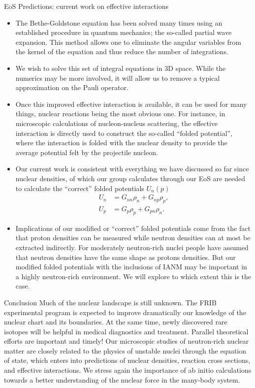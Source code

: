 \documentclass[serif]{beamer}
\begin{document}
\begin{frame}{}
\begin{columns}[t]
\begin{column}{0.32\paperwidth}
\begin{block}{EoS Predictions: current work on effective interactions}
\begin{itemize}
\item The Bethe-Goldstone equation has been solved many times using an established procedure in quantum mechanics; the so-called partial wave expansion. This method allows one to eliminate the angular variables from the kernel of the equation and thus reduce the number of integrations.
\item \alert{We wish to solve this set of integral equations in 3D space}. While the numerics may be more involved, it will allow us to remove a typical approximation on the Pauli operator.
\item Once this improved effective interaction is available, it can be used for many things, nuclear reactions being the most obvious one. For instance, in microscopic calculations of nucleon-nucleus scattering, the effective interaction is directly used to construct the so-called ``folded potential'', where the interaction is folded with the nuclear density to provide the average potential felt by the projectile nucleon.
\item \alert{Our current work is consistent with everything we have discussed so far} since nuclear densities, of which our group calculates through our EoS are needed to calculate the ``correct'' folded potentials $U_n(p)$
\begin{subequations}
\begin{align}
U_n & = G_{nn} \rho_n + G_{np} \rho_p, \\
U_p & = G_{p} \rho_p + G_{pn} \rho_n.
\end{align}
\label{eq:folded}
\end{subequations}
\item Implications of our modified or ``correct'' folded potentials come from the fact that proton densities can be measured while neutron densities can at most be extracted indirectly. For moderately neutron-rich nuclei people have assumed that neutron densities have the same shape as protons densities. But our modified folded potentials with the inclusions of IANM may be important in a highly neutron-rich environment. We will explore to which extent this is the case.
\end{itemize}
\end{block}
\begin{block}{Conclusion}
Much of the nuclear landscape is still unknown. The FRIB experimental program is expected to improve dramatically our knowledge of the nuclear chart and its boundaries. At the same time, newly discovered rare isotopes will be helpful in medical diagnostics and treatment. Parallel theoretical efforts are important and timely! Our microscopic studies of neutron-rich nuclear matter are closely related to the physics of unstable nuclei through the equation of state, which enters into predictions of nuclear densities, reaction cross sections, and effective interactions. We stress again the importance of ab initio calculations towards a better understanding of the nuclear force in the many-body system.

\end{block}
\end{column}
\end{columns}
\end{frame}
\end{document}
